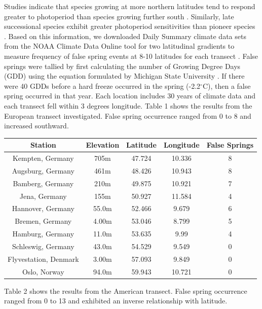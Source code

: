 \documentclass{article}\usepackage[]{graphicx}\usepackage[]{color}
\begin{document}
Studies indicate that species growing at more northern latitudes tend to respond greater to photoperiod than species growing further south \citep{Caffarra2011}. Similarly, late successional species exhibit greater photoperiod sensitivities than pioneer species \citep{Basler2012}. Based on this information, we downloaded Daily Summary climate data sets from the NOAA Climate Data Online tool for two latitudinal gradients to measure frequency of false spring events at 8-10 latitudes for each transect \citep{Menne2012, Menne2012b}. False springs were tallied by first calculating the number of Growing Degree Days (GDD) using the equation formulated by Michigan State University \citep{Nugent2005}. If there were 40 GDDs before a hard freeze occurred in the spring (-2.2$^{\circ}$C), then a false spring occurred in that year. Each location includes 30 years of climate data and each transect fell within 3 degrees longitude. Table 1 shows the results from the European transect investigated. False spring occurrence ranged from 0 to 8 and increased southward. 

\begin{center}
 \label{tab:title} 
\begin{tabular}{c c c c c}
\hline
Station & Elevation & Latitude & Longitude & False Springs \\
\hline
Kempten, Germany & 705m & 47.724 & 10.336 & 8 \\
Augsburg, Germany & 461m & 48.426 & 10.943 & 8 \\
Bamberg, Germany & 210m & 49.875 & 10.921 & 7 \\
Jena, Germany & 155m & 50.927 & 11.584 & 4 \\
Hannover, Germany & 55.0m & 52.466 & 9.679 & 6 \\
Bremen, Germany & 4.00m & 53.046 & 8.799 & 5 \\
Hamburg, Germany & 11.0m & 53.635 & 9.99 & 4 \\
Schleswig, Germany & 43.0m & 54.529 & 9.549 & 0 \\
Flyvestation, Denmark & 3.00m & 57.093 & 9.849 & 0 \\
Oslo, Norway & 94.0m & 59.943 & 10.721 & 0 \\
\hline
\end{tabular}
\end{center}

Table 2 shows the results from the American transect. False spring occurrence ranged from 0 to 13 and exhibited an inverse relationship with latitude. 
\end{document}
